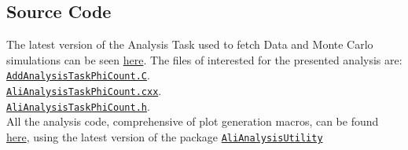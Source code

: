 \subsection{Source Code}
The latest version of the Analysis Task used to fetch Data and Monte Carlo simulations can be seen \href{https://github.com/alisw/AliPhysics/tree/master/PWGLF/RESONANCES/extra}{here}. The files of interested for the presented analysis are:\\
\href{https://github.com/alisw/AliPhysics/blob/master/PWGLF/RESONANCES/extra/AddAnalysisTaskPhiCount.C}{\texttt{AddAnalysisTaskPhiCount.C}}.\\
\href{https://github.com/alisw/AliPhysics/blob/master/PWGLF/RESONANCES/extra/AliAnalysisTaskPhiCount.cxx}{\texttt{AliAnalysisTaskPhiCount.cxx}}.\\
\href{https://github.com/alisw/AliPhysics/blob/master/PWGLF/RESONANCES/extra/AliAnalysisTaskPhiCount.h}{\texttt{AliAnalysisTaskPhiCount.h}}.\\
\indent All the analysis code, comprehensive of plot generation macros, can be found \href{https://github.com/Nikolajal/AliAnalysisPhiCount}{here}, using the latest version of the package \href{https://github.com/Nikolajal/AliAnalysisUtility.git}{\texttt{AliAnalysisUtility}}